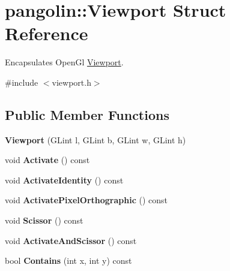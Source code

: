 \hypertarget{structpangolin_1_1_viewport}{}\section{pangolin\+:\+:Viewport Struct Reference}
\label{structpangolin_1_1_viewport}


Encapsulates Open\+Gl \hyperlink{structpangolin_1_1_viewport}{Viewport}.  




{\ttfamily \#include $<$viewport.\+h$>$}

\subsection*{Public Member Functions}
\begin{DoxyCompactItemize}
\item 
{\bfseries Viewport} (G\+Lint l, G\+Lint b, G\+Lint w, G\+Lint h)\hypertarget{structpangolin_1_1_viewport_a6cae39452b106a70af8b6980a1469e3b}{}\label{structpangolin_1_1_viewport_a6cae39452b106a70af8b6980a1469e3b}

\item 
void {\bfseries Activate} () const \hypertarget{structpangolin_1_1_viewport_ac54528ac9d550fc46d21eb923b1715d7}{}\label{structpangolin_1_1_viewport_ac54528ac9d550fc46d21eb923b1715d7}

\item 
void {\bfseries Activate\+Identity} () const \hypertarget{structpangolin_1_1_viewport_ac2c656ff85ad388a9e20f3ef2404eed5}{}\label{structpangolin_1_1_viewport_ac2c656ff85ad388a9e20f3ef2404eed5}

\item 
void {\bfseries Activate\+Pixel\+Orthographic} () const \hypertarget{structpangolin_1_1_viewport_a853b3b1bf1215853199e6b337e0db170}{}\label{structpangolin_1_1_viewport_a853b3b1bf1215853199e6b337e0db170}

\item 
void {\bfseries Scissor} () const \hypertarget{structpangolin_1_1_viewport_a3a1fd0231848db4990fdb76b913303ff}{}\label{structpangolin_1_1_viewport_a3a1fd0231848db4990fdb76b913303ff}

\item 
void {\bfseries Activate\+And\+Scissor} () const \hypertarget{structpangolin_1_1_viewport_a38922182bd93bd4b5b6e99cfaaa23865}{}\label{structpangolin_1_1_viewport_a38922182bd93bd4b5b6e99cfaaa23865}

\item 
bool {\bfseries Contains} (int x, int y) const \hypertarget{structpangolin_1_1_viewport_a364bafc1b94bc487f67aa7e2e33c4779}{}\label{structpangolin_1_1_viewport_a364bafc1b94bc487f67aa7e2e33c4779}


\end{DoxyCompactItemize}
